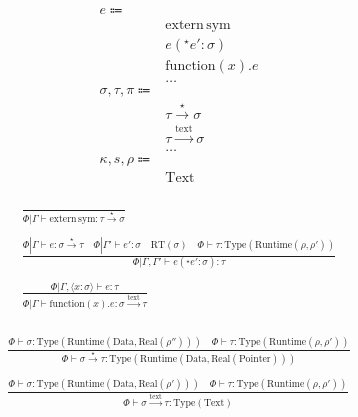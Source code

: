 \documentclass {article}
\begin{document}
\begin{align*}
e \Coloneqq & \\
& \text{extern} \, \text{sym} \tag{Extern Function} \\
& e(^\star e' : \sigma) \tag{Function Pointer Application} \\
& \text{function} (x). e \tag{Function Literal} \\
& \dots \\
\sigma, \tau, \pi \Coloneqq & \\
& \tau \xrightarrow{\star} \sigma \tag{Function Pointer}\\
& \tau \xrightarrow{\text{text}} \sigma  \tag{Function Literal Type} \\
& \dots \\
\kappa, s, \rho \Coloneqq & \\
& \text{Text} \tag{Symbol Stage} \\
\end{align*}

\begin{gather*}
\frac
{}
{\Phi | \Gamma \vdash \text{extern} \, \text{sym} : \tau \xrightarrow{\star} \sigma} \\
\\
\frac
{\Phi | \Gamma \vdash e : \sigma \xrightarrow{\star} \tau \quad \Phi | \Gamma' \vdash e' : \sigma \quad \text{RT}(\sigma) \quad \Phi \vdash \tau : \text{Type} (\text{Runtime} (\rho, \rho'))}
{\Phi | \Gamma, \Gamma' \vdash e(^\star e' : \sigma) : \tau} \\
\\
\frac
{\Phi | \Gamma, \langle x : \sigma \rangle \vdash e : \tau}
{\Phi | \Gamma \vdash \text{function}(x). e : \sigma \xrightarrow{\text{text}} \tau} \\
\end{gather*}

\begin{gather*}
\frac
{\Phi \vdash \sigma : \text{Type} (\text{Runtime} (\text{Data}, \text{Real} (\rho''))) \quad \Phi \vdash \tau : \text{Type} (\text{Runtime} (\rho, \rho'))}
{\Phi \vdash \sigma \xrightarrow{\star} \tau : \text{Type} (\text{Runtime} (\text{Data}, \text{Real} ( \text{Pointer})))} \\
\\
\frac
{\Phi \vdash \sigma : \text{Type} (\text{Runtime} (\text{Data}, \text{Real}( \rho' ))) \quad \Phi \vdash \tau : \text{Type} (\text{Runtime} (\rho, \rho'))}
{\Phi \vdash \sigma \xrightarrow{\text{text}} \tau : \text{Type} (\text{Text})} \\
\end{gather*}
\end{document}
